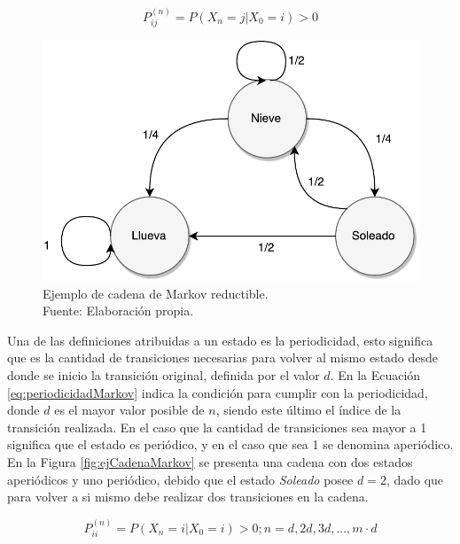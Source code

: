 \begin{equation} \label{eq:accesibleMarkov}
	P_{ij}^{(n)} = P(X_n = j | X_0 = i) > 0
\end{equation}

\begin{figure}[ht!]
	\centering
	\includegraphics[scale=0.5]{images/EjCadenaMarkov-Reductible.pdf}
	\caption[Ejemplo de cadena de Markov reductible.]{Ejemplo de cadena de Markov reductible.\\Fuente: Elaboraci\'on propia.}
	\label{fig:ejCadenaMarkov-Reductible}
\end{figure}

\normalsize{Una de las definiciones atribuidas a un estado es la periodicidad, esto significa que es la cantidad de transiciones necesarias para volver al mismo estado desde donde se inicio la transici\'on original, definida por el valor $d$. En la Ecuaci\'on} \ref{eq:periodicidadMarkov} \normalsize{indica la condici\'on para cumplir con la periodicidad, donde $d$ es el mayor valor posible de $n$, siendo este \'ultimo el \'indice de la transici\'on realizada. En el caso que la cantidad de transiciones sea mayor a 1 significa que el estado es peri\'odico, y en el caso que sea 1 se denomina aperi\'odico. En la Figura} \ref{fig:ejCadenaMarkov} \normalsize{se presenta una cadena con dos estados aperi\'odicos y uno peri\'odico, debido que el estado \textit{Soleado} posee $d=2$, dado que para volver a si mismo debe realizar dos transiciones en la cadena.}

\begin{equation} \label{eq:periodicidadMarkov}
	P_{ii}^{(n)} = P(X_n = i | X_0 = i) > 0 ; n = {d,2d,3d,..., m \cdot d}
\end{equation}

